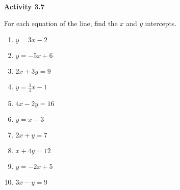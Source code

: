   \vspace{1ex}
\noindent\textbf{Activity 3.7}

\vspace{0.75ex}

For each equation of the line, find the $x$ and $y$ intercepts.
\begin{multicols}{2}
\begin{enumerate}[noitemsep, label = \color{blue}\arabic*. ]
    \item $y = 3x - 2$
    \item $y = -5x + 6$
    \item $2x + 3y = 9$
    \item $y = \frac{3}{4}x - 1$
    \item $4x - 2y = 16$
    \item $y = x - 3$
    \item $2x + y = 7$
    \item $x + 4y = 12$
    \item $y = -2x + 5$
    \item $3x - y = 9$
\end{enumerate}
\end{multicols}

